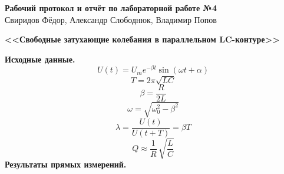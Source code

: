 \documentclass[ a4paper]{article}
\begin{document}
	\begin{center}
		{\large\textbf{Рабочий протокол и отчёт по лабораторной работе №4 }}\\
		Свиридов Фёдор, Александр Слободнюк, Владимир Попов
	\end{center}
	\begin{center}
		\Large\bfseries{<<Свободные затухающие колебания в параллельном LC-контуре>>}\\
	\end{center}
	{\parindent=0pt\textbf{Исходные данные.}}\\
	\begin{equation}
		U(t)=U_me^{-\beta t}\sin(\omega t + \alpha)
			\end{equation}
				\begin{equation}
			T=2\pi\sqrt{LC}
		\end{equation}
		\begin{equation}
			\beta = \frac{R}{2L}
		\end{equation}
			\begin{equation}
		\omega=\sqrt{\omega_0^2-\beta^2}
	\end{equation}
		\begin{equation}
	\lambda=\frac{U(t)}{U(t+T)}=\beta T
\end{equation}
		\begin{equation}
	Q\approx\frac{1}{R}\,\sqrt{\frac{L}{C}}
\end{equation}
	{\parindent=0pt\textbf{Результаты прямых измерений.}}\\
\end{document}
